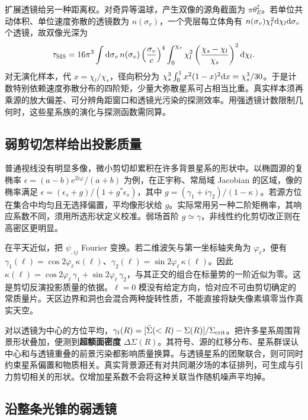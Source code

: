 扩展透镜给另一种距离权。对奇异等温球，产生双像的源角截面为 $\pi\theta_E^2$。若单位共动体积、单位速度弥散的透镜数为 $n(\sigma_v)$，一个壳层每立体角有 $n(\sigma_v)\chi_l^2\dd\chi_l\dd\sigma_v$ 个透镜，故双像光深为
\[
 \tau_{\rm SIS}=16\pi^3\int\dd\sigma_v\,n(\sigma_v)
  \left(\frac{\sigma_v}{c}\right)^4
  \int_0^{\chi_s}\chi_l^2
       \left(\frac{\chi_s-\chi_l}{\chi_s}\right)^2\dd\chi_l .
\]
对无演化样本，代 $x=\chi_l/\chi_s$，径向积分为 $\chi_s^3\int_0^1x^2(1-x)^2\dd x=\chi_s^3/30$。于是计数特别依赖速度弥散分布的四阶矩，少量大弥散星系可占相当比重。真实样本须再乘源的放大偏差、可分辨角距窗口和透镜光污染的探测效率。用强透镜计数限制几何时，这些星系族的演化与探测函数需同算。


\subsection{弱剪切怎样给出投影质量}

普通视线没有明显多像，微小剪切却累积在许多背景星系的形状中。以椭圆源的复椭率 $\epsilon=(a-b)e^{2i\varphi}/(a+b)$ 为例，在正宇称、常局域 Jacobian 的区域，像的椭率满足 $\epsilon=(\epsilon_s+g)/(1+g^*\epsilon_s)$，其中 $g=(\gamma_1+i\gamma_2)/(1-\kappa)$。若源方位在集合中均匀且无选择偏置，平均像形状给 $g$。实际常用另一种二阶矩椭率，其响应系数不同，须用所选形状定义校准。弱场首阶 $g\simeq\gamma$，非线性约化剪切改正则在高密区更明显。

在平天近似，把 $\psi_{,ij}$ Fourier 变换。若二维波矢与第一坐标轴夹角为 $\varphi_\ell$，便有 $\gamma_1(\bm\ell)=\cos2\varphi_\ell\,\kappa(\bm\ell)$、$\gamma_2(\bm\ell)=\sin2\varphi_\ell\,\kappa(\bm\ell)$。因此 $\kappa(\bm\ell)=\cos2\varphi_\ell\,\gamma_1+\sin2\varphi_\ell\,\gamma_2$，与其正交的组合在标量势的一阶近似为零。这是剪切反演投影质量的依据。$\ell=0$ 模没有给定方向，恰对应不可由剪切确定的常质量片。天区边界和洞也会混合两种旋转性质，不能直接将缺失像素填零当作真实天空。

对以透镜为中心的方位平均，$\gamma_t(R)=[\bar\Sigma(<R)-\Sigma(R)]/\Sigma_{\rm crit}$。把许多星系周围背景形状叠加，便测到\textbf{超额面密度} $\Delta\Sigma(R)$。其符号、源的红移分布、星系群误认中心和与透镜重叠的前景污染都影响质量换算。与透镜星系的团聚联合，则可同时约束星系偏置和物质相关。真实背景源还有对共同潮汐场的本征排列，可生成与引力剪切相关的形状。仅增加星系数不会将这种关联当作随机噪声平均掉。

\subsection{沿整条光锥的弱透镜}

